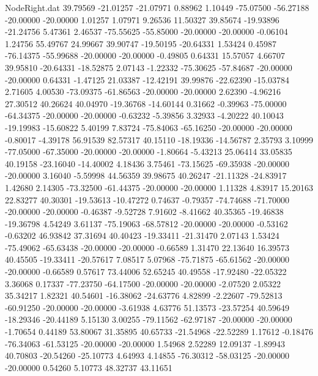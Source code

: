 \begin{filecontents}{NodeRight.dat}
  39.79569  -21.01257  -21.07971     0.88962    1.10449  -75.07500  -56.27188  -20.00000  -20.00000    1.01257    1.07971    9.26536   11.50327
  39.85674  -19.93896  -21.24756     5.47361    2.46537  -75.55625  -55.85000  -20.00000  -20.00000   -0.06104    1.24756   55.49767   24.99667
  39.90747  -19.50195  -20.64331     1.53424    0.45987  -76.14375  -55.99688  -20.00000  -20.00000   -0.49805    0.64331   15.57057    4.66707
  39.95810  -20.64331  -18.52875     2.07143   -1.22332  -75.30625  -57.84687  -20.00000  -20.00000    0.64331   -1.47125   21.03387  -12.42191
  39.99876  -22.62390  -15.03784     2.71605    4.00530  -73.09375  -61.86563  -20.00000  -20.00000    2.62390   -4.96216   27.30512   40.26624
  40.04970  -19.36768  -14.60144     0.31662   -0.39963  -75.00000  -64.34375  -20.00000  -20.00000   -0.63232   -5.39856    3.32933   -4.20222
  40.10043  -19.19983  -15.60822     5.40199    7.83724  -75.84063  -65.16250  -20.00000  -20.00000   -0.80017   -4.39178   56.91539   82.57317
  40.15110  -18.19336  -14.56787     2.35793    3.10999  -77.05000  -67.35000  -20.00000  -20.00000   -1.80664   -5.43213   25.06414   33.05835
  40.19158  -23.16040  -14.40002     4.18436    3.75461  -73.15625  -69.35938  -20.00000  -20.00000    3.16040   -5.59998   44.56359   39.98675
  40.26247  -21.11328  -24.83917     1.42680    2.14305  -73.32500  -61.44375  -20.00000  -20.00000    1.11328    4.83917   15.20163   22.83277
  40.30301  -19.53613  -10.47272     0.74637   -0.79357  -74.74688  -71.70000  -20.00000  -20.00000   -0.46387   -9.52728    7.91602   -8.41662
  40.35365  -19.46838  -19.36798     4.54249    3.61137  -75.19063  -68.57812  -20.00000  -20.00000   -0.53162   -0.63202   46.93842   37.31694
  40.40423  -19.33411  -21.31470     2.07143    1.53424  -75.49062  -65.63438  -20.00000  -20.00000   -0.66589    1.31470   22.13640   16.39573
  40.45505  -19.33411  -20.57617     7.08517    5.07968  -75.71875  -65.61562  -20.00000  -20.00000   -0.66589    0.57617   73.44006   52.65245
  40.49558  -17.92480  -22.05322     3.36068    0.17337  -77.23750  -64.17500  -20.00000  -20.00000   -2.07520    2.05322   35.34217    1.82321
  40.54601  -16.38062  -24.63776     4.82899   -2.22607  -79.52813  -60.91250  -20.00000  -20.00000   -3.61938    4.63776   51.13573  -23.57254
  40.59649  -18.29346  -20.44189     5.15130    3.00255  -79.11562  -62.97187  -20.00000  -20.00000   -1.70654    0.44189   53.80067   31.35895
  40.65733  -21.54968  -22.52289     1.17612   -0.18476  -76.34063  -61.53125  -20.00000  -20.00000    1.54968    2.52289   12.09137   -1.89943
  40.70803  -20.54260  -25.10773     4.64993    4.14855  -76.30312  -58.03125  -20.00000  -20.00000    0.54260    5.10773   48.32737   43.11651

\end{filecontents}
